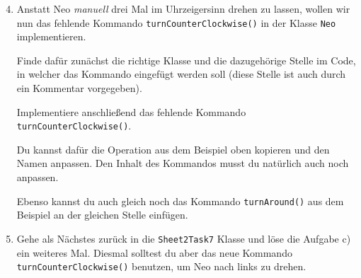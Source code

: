 \begin{enumerate} \setcounter{enumi}{3}
    \item Anstatt Neo \textit{manuell} drei Mal im Uhrzeigersinn drehen zu lassen, wollen wir nun das fehlende Kommando \lstinline{turnCounterClockwise()} in der Klasse \lstinline{Neo} implementieren.

        Finde dafür zunächst die richtige Klasse und die dazugehörige Stelle im Code, in welcher das Kommando eingefügt werden soll (diese Stelle ist auch durch ein Kommentar vorgegeben).

        Implementiere anschließend das fehlende Kommando \lstinline{turnCounterClockwise()}.
        
        Du kannst dafür die Operation aus dem Beispiel oben kopieren und den Namen anpassen.
        Den Inhalt des Kommandos musst du natürlich auch noch anpassen.

        Ebenso kannst du auch gleich noch das Kommando \lstinline{turnAround()} aus dem Beispiel an der gleichen Stelle einfügen.

    \item Gehe als Nächstes zurück in die \lstinline{Sheet2Task7} Klasse und löse die Aufgabe c) ein weiteres Mal.
        Diesmal solltest du aber das neue Kommando \lstinline{turnCounterClockwise()} benutzen, um Neo nach links zu drehen.
\end{enumerate}


